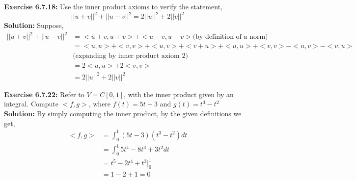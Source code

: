 \documentclass{amsart}
\begin{document}
\noindent\textbf{Exercise 6.7.18: } Use the inner product axioms to verify the statement,
\begin{equation*}
||u+v||^2 + ||u-v||^2 = 2||u||^2+2||v||^2 
\end{equation*}
\noindent \textbf{Solution: } Suppose,
\begin{align*}
||u+v||^2 + ||u-v||^2 &= <u+v,u+v>+<u-v,u-v> \text{(by definition of a norm)}\\
&= <u,u>+<v,v>+<u,v> + <v+u> + <u,u> + <v,v> - <u,v> - <v,u> \text{}\\
&\text{(expanding by inner product axiom 2)}\\
&= 2<u,u> +2<v,v>\\
&= 2||u||^2+2||v||^2 
\end{align*}
\vspace{1in}



\noindent\textbf{Exercise 6.7.22: } Refer to $V = C[0,1]$, with the inner product given by an integral. Compute $<f,g>$, where $f(t) = 5t - 3$ and $g(t) = t^3 - t^2$\\ 
\noindent \textbf{Solution: }By simply computing the inner product, by the given definitions we get,
\begin{align*}
<f,g> &= \int_{0}^{1} (5t - 3)(t^3 - t^2)dt\\
&= \int_{0}^{1} 5t^4-8t^3+3t^2 dt\\
&= {t^5-2t^4+t^3}|_{0}^{1}\\
&=1-2+1 = 0
\end{align*}

\vspace{1in}
\end{document}
